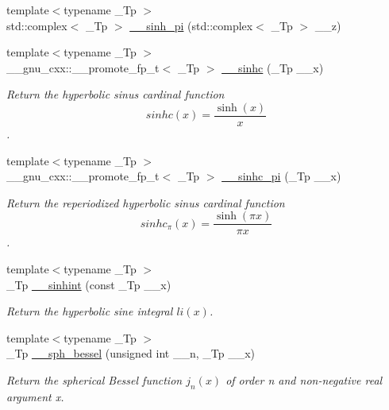 \begin{DoxyCompactItemize}
\item 
{\footnotesize template$<$typename \+\_\+\+Tp $>$ }\\std\+::complex$<$ \+\_\+\+Tp $>$ \hyperlink{namespacestd_1_1____detail_aa8fe06b3d9584ea9c81b0349ba7eb2dc}{\+\_\+\+\_\+sinh\+\_\+pi} (std\+::complex$<$ \+\_\+\+Tp $>$ \+\_\+\+\_\+z)
\item 
{\footnotesize template$<$typename \+\_\+\+Tp $>$ }\\\+\_\+\+\_\+gnu\+\_\+cxx\+::\+\_\+\+\_\+promote\+\_\+fp\+\_\+t$<$ \+\_\+\+Tp $>$ \hyperlink{namespacestd_1_1____detail_a542bbc5f25643898444c02fbaec5c820}{\+\_\+\+\_\+sinhc} (\+\_\+\+Tp \+\_\+\+\_\+x)
\begin{DoxyCompactList}\small\item\em Return the hyperbolic sinus cardinal function \[ sinhc(x) = \frac{\sinh(x)}{x} \]. \end{DoxyCompactList}\item 
{\footnotesize template$<$typename \+\_\+\+Tp $>$ }\\\+\_\+\+\_\+gnu\+\_\+cxx\+::\+\_\+\+\_\+promote\+\_\+fp\+\_\+t$<$ \+\_\+\+Tp $>$ \hyperlink{namespacestd_1_1____detail_adcb7d17819902a9b4fa0bd5543dd3f6b}{\+\_\+\+\_\+sinhc\+\_\+pi} (\+\_\+\+Tp \+\_\+\+\_\+x)
\begin{DoxyCompactList}\small\item\em Return the reperiodized hyperbolic sinus cardinal function \[ sinhc_\pi(x) = \frac{\sinh(\pi x)}{\pi x} \]. \end{DoxyCompactList}\item 
{\footnotesize template$<$typename \+\_\+\+Tp $>$ }\\\+\_\+\+Tp \hyperlink{namespacestd_1_1____detail_ac629f9c743a716608af2007d2e34438d}{\+\_\+\+\_\+sinhint} (const \+\_\+\+Tp \+\_\+\+\_\+x)
\begin{DoxyCompactList}\small\item\em Return the hyperbolic sine integral $ li(x) $. \end{DoxyCompactList}\item 
{\footnotesize template$<$typename \+\_\+\+Tp $>$ }\\\+\_\+\+Tp \hyperlink{namespacestd_1_1____detail_ac2ae8a144f79bd793e1b5d80a3b082b1}{\+\_\+\+\_\+sph\+\_\+bessel} (unsigned int \+\_\+\+\_\+n, \+\_\+\+Tp \+\_\+\+\_\+x)
\begin{DoxyCompactList}\small\item\em Return the spherical Bessel function $ j_n(x) $ of order n and non-\/negative real argument {\ttfamily x}. \end{DoxyCompactList}\item 

\end{DoxyCompactItemize}
